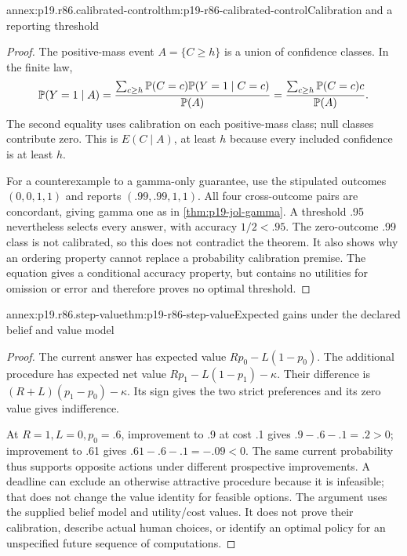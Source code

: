 \begin{annexitem}{annex:p19.r86.calibrated-control}{thm:p19-r86-calibrated-control}{Calibration and a reporting threshold}
\begin{proof}
The positive-mass event \(A=\{C\geq h\}\) is a union of confidence
classes. In the finite law,
\[
 \mathbb P(Y=1\mid A)
  ={\sum_{c\geq h}\mathbb P(C=c)\mathbb P(Y=1\mid C=c)
      \over\mathbb P(A)}
  ={\sum_{c\geq h}\mathbb P(C=c)c\over\mathbb P(A)}.
\]
The second equality uses calibration on each positive-mass class; null
classes contribute zero. This is \(E(C\mid A)\), at least \(h\)
because every included confidence is at least \(h\).

For a counterexample to a gamma-only guarantee, use the stipulated outcomes
\((0,0,1,1)\) and reports \((.99,.99,1,1)\). All four cross-outcome
pairs are concordant, giving gamma one as in
\ref{thm:p19-jol-gamma}. A threshold .95 nevertheless selects every
answer, with accuracy \(1/2<.95\). The zero-outcome .99 class is not
calibrated, so this does not contradict the theorem. It also shows why an
ordering property cannot replace a probability calibration premise. The
equation gives a conditional accuracy property, but contains no utilities
for omission or error and therefore proves no optimal threshold.
\end{proof}
\end{annexitem}

\begin{annexitem}{annex:p19.r86.step-value}{thm:p19-r86-step-value}{Expected gains under the declared belief and value model}
\begin{proof}
The current answer has expected value \(Rp_0-L(1-p_0)\).
The additional procedure has expected net value
\(Rp_1-L(1-p_1)-\kappa\). Their difference is
\((R+L)(p_1-p_0)-\kappa\). Its sign gives the two strict
preferences and its zero value gives indifference.

At \(R=1,L=0,p_0=.6\), improvement to .9 at cost .1 gives
\(.9-.6-.1=.2>0\); improvement to .61 gives
\(.61-.6-.1=-.09<0\). The same current probability thus supports
opposite actions under different prospective improvements. A deadline can
exclude an otherwise attractive procedure because it is infeasible; that
does not change the value identity for feasible options. The argument uses
the supplied belief model and utility/cost values. It does not prove their
calibration, describe actual human choices, or identify an optimal policy
for an unspecified future sequence of computations.
\end{proof}
\end{annexitem}
